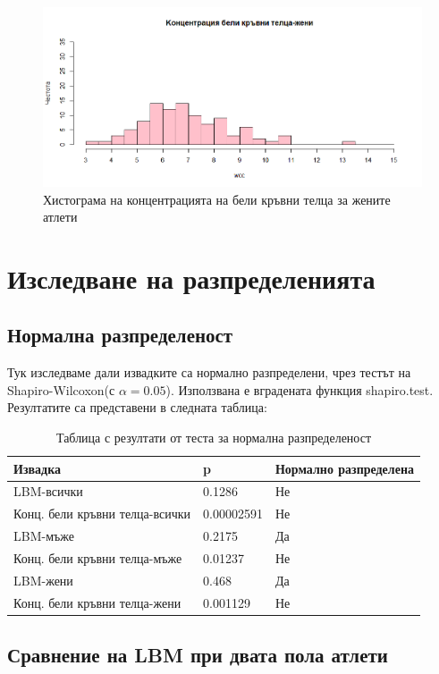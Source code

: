 \documentclass[12pt]{article}
\begin{document}
\begin{large}
\begin{figure}[h!]
\includegraphics[width=\textwidth,height=\textheight,keepaspectratio]{pics/wccwomen}
\caption{Хистограма на концентрацията на бели кръвни телца за жените атлети}
\end{figure}

\section{Изследване на разпределенията}

\subsection{Нормална разпределеност}
Тук изследваме дали извадките са нормално разпределени, чрез тестът на Shapiro-Wilcoxon(с $\alpha=0.05$). Използвана е вградената функция shapiro.test. Резултатите са представени в следната таблица:

\begin{table}[h!]
\centering
\begin{tabular}{|l|l|l|}
 \hline 
 Извадка & p & Нормално разпределена\\
 \hline \hline
 LBM-всички & 0.1286 & Не \\
 \hline
 Конц. бели кръвни телца-всички & 0.00002591 & Не \\
 \hline
 LBM-мъже & 0.2175 & Да \\
 \hline
 Конц. бели кръвни телца-мъже & 0.01237 & Не \\
 \hline
 LBM-жени & 0.468 & Да \\
 \hline
 Конц. бели кръвни телца-жени & 0.001129 & Не \\
 \hline
\end{tabular}
\caption{Таблица с резултати от теста за нормална разпределеност}
\end{table}

\subsection{Сравнение на LBM при двата пола атлети}


\end{large}
\end{document}
